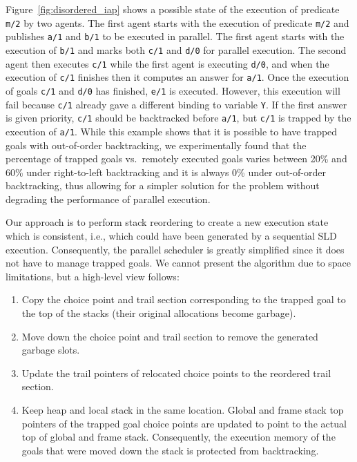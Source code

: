 \documentclass{tlp}
\begin{document}
\noindent
Figure~\ref{fig:disordered_iap} shows a possible state of the
execution of predicate \lstinline{m/2} by two agents. The first agent
starts with the execution of predicate \lstinline{m/2} and publishes
\lstinline{a/1} and \lstinline{b/1} to be executed in parallel.  The
first agent starts with the execution of \lstinline{b/1} and marks
both \lstinline{c/1} and \lstinline{d/0} for parallel execution. The
second agent then executes \lstinline{c/1} while the first agent is
executing \lstinline{d/0}, and when the execution of \lstinline{c/1}
finishes then it computes an answer for \lstinline{a/1}. Once the
execution of goals \lstinline{c/1} and \lstinline{d/0} has finished,
\lstinline{e/1} is executed. However, this execution will fail because
\lstinline{c/1} already gave a different binding to variable
\lstinline{Y}. If the first answer is given priority, \lstinline{c/1}
should be backtracked before \lstinline{a/1}, but \lstinline{c/1} is
trapped by the execution of \lstinline{a/1}.  While 
this example shows that it is possible to have trapped goals with
out-of-order backtracking, we experimentally found that  the
  percentage of trapped goals  vs.\ remotely executed goals varies
  between 20\% and 60\% under right-to-left backtracking and it is
  always 0\% under out-of-order backtracking,
thus allowing for a
simpler solution for the  
problem without degrading the performance of parallel execution.

Our approach is to perform stack reordering to create a new execution
state which is consistent, i.e., which could have been generated by a
sequential SLD execution. Consequently, the parallel scheduler is
greatly simplified since it does not have to manage trapped goals.  We
cannot present the algorithm due to space limitations, but a high-level
view follows:

\begin{enumerate}
\item Copy the choice point and trail section corresponding to the
  trapped goal to the top of the stacks (their original allocations
  become garbage).
\item Move down the choice point and trail section to remove the
  generated garbage slots.
\item Update the trail pointers of relocated choice points to the 
  reordered trail section.
\item Keep heap and local stack in the same location. Global and frame
  stack top pointers of the trapped goal choice points are updated to
  point to the actual top of global and frame stack. Consequently, the
  execution memory of the goals that were moved down the stack is
  protected from backtracking.
\end{enumerate}
\end{document}
